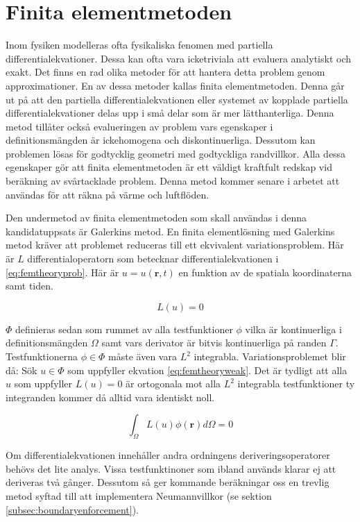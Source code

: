 \section{Finita elementmetoden}

Inom fysiken modelleras ofta fysikaliska fenomen med partiella differentialekvationer.
Dessa kan ofta vara icketriviala att evaluera analytiskt och exakt. Det finns en
rad olika metoder för att hantera detta problem genom approximationer. En av
dessa metoder kallas finita elementmetoden. Denna går ut på att den
partiella differentialekvationen eller systemet av kopplade partiella
differentialekvationer delas upp i små delar som är mer lätthanterliga.
Denna metod tillåter också evalueringen av problem vars egenskaper i
definitionsmängden är ickehomogena och diskontinuerliga. Dessutom kan
problemen lösas för godtycklig geometri med godtyckliga randvillkor. Alla
dessa egenskaper gör att finita elementmetoden är ett väldigt kraftfult redskap
vid beräkning av svårtacklade problem. Denna metod kommer senare i arbetet
att användas för att räkna på värme och luftflöden.

Den undermetod av finita elementmetoden som skall användas i denna
kandidatuppsats är Galerkins metod.
En finita elementlösning med Galerkins metod kräver att problemet reduceras till
ett ekvivalent variationsproblem.
Här är $L$ differentialoperatorn
som betecknar differentialekvationen i \eqref{eq:femtheoryprob}.
Här är $u = u(\mathbf{r},t)$ en funktion av de spatiala koordinaterna samt tiden.

\begin{equation}
\label{eq:femtheoryprob}
L(u) = 0
\end{equation}

\noindent
$\Phi$ definieras sedan som rummet av alla testfunktioner $\phi$ vilka
 är kontinuerliga i
definitionsmängden $\Omega$ samt vars derivator är bitvis kontinuerliga på randen
$\Gamma$. Testfunktionerna $\phi \in \Phi$ måste även vara $L^2$ integrabla.
Variationsproblemet blir då: Sök $u\in\Phi$
som uppfyller ekvation \eqref{eq:femtheoryweak}. Det är tydligt
att alla $u$ som uppfyller $L(u) = 0$ är ortogonala mot alla
$L^2$ integrabla testfunktioner ty integranden kommer då alltid vara identiskt noll.

\begin{equation}
\label{eq:femtheoryweak}
\int_\Omega L(u)\phi(\mathbf{r}) d\Omega = 0
\end{equation}

\noindent
Om differentialekvationen innehåller andra ordningens deriveringsoperatorer behövs
det lite analys. Vissa testfunktinoner som ibland används klarar ej att deriveras
två gånger. Dessutom så ger kommande beräkningar oss en trevlig metod syftad
till att implementera Neumannvillkor (se sektion \ref{subsec:boundaryenforcement}).

